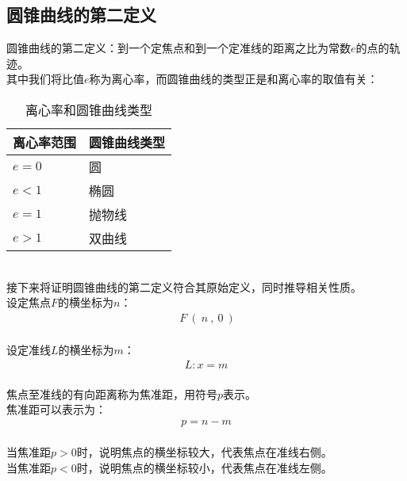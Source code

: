 \documentclass[UTF8]{ctexart}
\begin{document}
\subsection{圆锥曲线的第二定义}
    圆锥曲线的第二定义：到一个定焦点和到一个定准线的距离之比为常数$e$的点的轨迹。\\[3mm]
    其中我们将比值$e$称为离心率，而圆锥曲线的类型正是和离心率的取值有关：\vspace{5pt}
    \setcounter{equation}{0}
    \begin{table}[h]
        \begin{center}
            \begin{tabular}{l|l}
                \hline
                离心率范围\qquad\qquad\qquad\qquad&圆锥曲线类型\qquad\qquad\qquad\qquad\\ \hline
                $e=0$&圆\\ \hline
                $e<1$&椭圆\\ \hline
                $e=1$&抛物线\\ \hline
                $e>1$&双曲线\\ \hline
            \end{tabular}
            \caption{离心率和圆锥曲线类型}
        \end{center}
    \end{table}\\
    接下来将证明圆锥曲线的第二定义符合其原始定义，同时推导相关性质。\\[6mm]
    设定焦点$F$的横坐标为$n$：
    \setcounter{equation}{0}
    \begin{align}
        ~F~(~n~,~0~)
    \end{align}\\
    设定准线$L$的横坐标为$m$：
    \begin{align}
        L:x=m
    \end{align}\\
    焦点至准线的有向距离称为焦准距，用符号$p$表示。\\[3mm]
    焦准距可以表示为：
    \begin{align}
        p=n-m
    \end{align}\\
    当焦准距$p>0$时，说明焦点的横坐标较大，代表焦点在准线右侧。\\[2mm]
    当焦准距$p<0$时，说明焦点的横坐标较小，代表焦点在准线左侧。

\newpage
\end{document}
